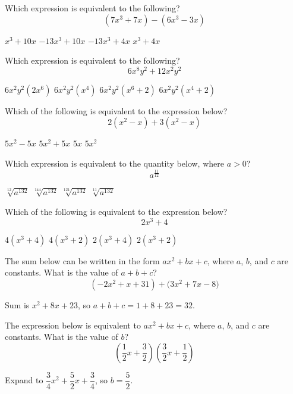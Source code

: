 \newpage

\question[1]
Which expression is equivalent to the following?
\[
  \left(7 x^{3}+7 x\right)-\left(6 x^{3}-3 x\right)
\]
\begin{choices}
  \CorrectChoice $x^{3}+10 x$
  \choice $-13 x^{3}+10 x$
  \choice $-13 x^{3}+4 x$
  \choice $x^{3}+4 x$
\end{choices}

\question[1]
Which expression is equivalent to the following?
\[
  6 x^{8} y^{2}+12 x^{2} y^{2}
\]
\begin{choices}
  \choice $6 x^{2} y^{2}\left(2 x^{6}\right)$
  \choice $6 x^{2} y^{2}\left(x^{4}\right)$
  \CorrectChoice $6 x^{2} y^{2}\left(x^{6}+2\right)$
  \choice $6 x^{2} y^{2}\left(x^{4}+2\right)$
\end{choices}

\question[1]
Which of the following is equivalent to the expression below?
\[
  2\left(x^{2}-x\right)+3\left(x^{2}-x\right)
\]
\begin{choices}
  \CorrectChoice $5 x^{2}-5 x$
  \choice $5 x^{2}+5 x$
  \choice $5 x$
  \choice $5 x^{2}$
\end{choices}

\newpage


\question[1]
Which expression is equivalent to the quantity below, where $a>0$?
\[
  a^{\frac{11}{12}}
\]
\begin{choices}
  \choice $\sqrt[12]{a^{132}}$
  \CorrectChoice $\sqrt[144]{a^{132}}$
  \choice $\sqrt[121]{a^{132}}$
  \choice $\sqrt[11]{a^{132}}$
\end{choices}

\question[1]
Which of the following is equivalent to the expression below?
\[
  2 x^{3}+4
\]
\begin{choices}
  \choice $4\left(x^{3}+4\right)$
  \choice $4\left(x^{3}+2\right)$
  \choice $2\left(x^{3}+4\right)$
  \CorrectChoice $2\left(x^{3}+2\right)$
\end{choices}

\question[1]
The sum below can be written in the form $a x^{2}+b x+c$, where $a$, $b$, and $c$ are constants. What is the value of $a+b+c$?
\[
  (-2 x^{2}+x+31)+\bigl(3 x^{2}+7 x-8\bigr)
\]
\begin{solutionorbox}[1in]
  Sum is $x^{2}+8x+23$, so $a+b+c=1+8+23=32$.
\end{solutionorbox}

\newpage


\question[1]
The expression below is equivalent to $a x^{2}+b x+c$, where $a$, $b$, and $c$ are constants. What is the value of $b$?
\[
  \left(\frac{1}{2} x+\frac{3}{2}\right)\left(\frac{3}{2} x+\frac{1}{2}\right)
\]
\begin{solutionorbox}[1in]
  Expand to $\dfrac{3}{4}x^{2}+\dfrac{5}{2}x+\dfrac{3}{4}$, so $b=\dfrac{5}{2}$.
\end{solutionorbox}

